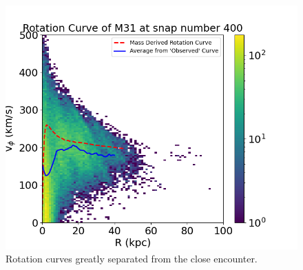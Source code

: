 \documentclass[twocolumn,linenumbers,trackchanges]{aastex7}
\begin{document}
\begin{figure}[ht!]
	\centering
	\includegraphics[width=1.0\linewidth]{M31_400_rotation_curve.png}
	\caption{Rotation curves greatly separated from the close encounter.}
\end{figure}

\end{document}
